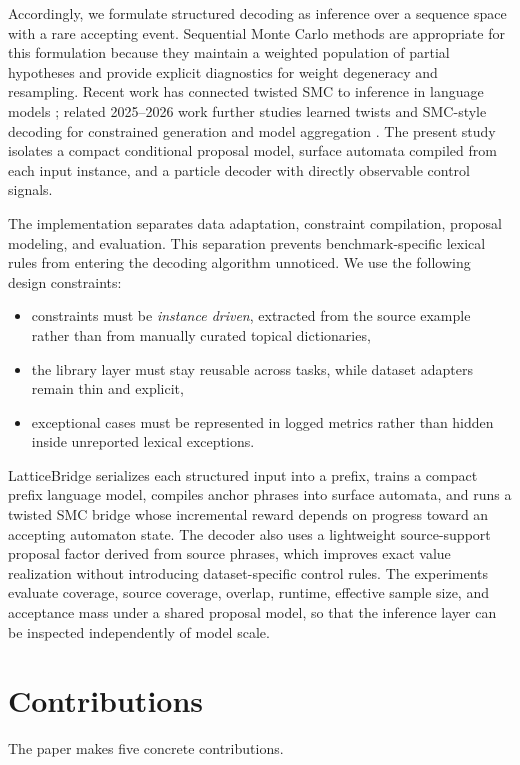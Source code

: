 \documentclass[11pt]{article}
\begin{document}
Accordingly, we formulate structured decoding as inference over a sequence space with a rare accepting event. Sequential Monte Carlo methods are appropriate for this formulation because they maintain a weighted population of partial hypotheses and provide explicit diagnostics for weight degeneracy and resampling. Recent work has connected twisted SMC to inference in language models \citep{zhao2024probabilistic,wu2024step}; related 2025--2026 work further studies learned twists and SMC-style decoding for constrained generation and model aggregation \citep{selfdistilled2025twisted,chan2026ensembling}. The present study isolates a compact conditional proposal model, surface automata compiled from each input instance, and a particle decoder with directly observable control signals.

The implementation separates data adaptation, constraint compilation, proposal modeling, and evaluation. This separation prevents benchmark-specific lexical rules from entering the decoding algorithm unnoticed. We use the following design constraints:
\begin{itemize}[leftmargin=1.5em]
  \item constraints must be \emph{instance driven}, extracted from the source example rather than from manually curated topical dictionaries,
  \item the library layer must stay reusable across tasks, while dataset adapters remain thin and explicit,
  \item exceptional cases must be represented in logged metrics rather than hidden inside unreported lexical exceptions.
\end{itemize}

LatticeBridge serializes each structured input into a prefix, trains a compact prefix language model, compiles anchor phrases into surface automata, and runs a twisted SMC bridge whose incremental reward depends on progress toward an accepting automaton state. The decoder also uses a lightweight source-support proposal factor derived from source phrases, which improves exact value realization without introducing dataset-specific control rules. The experiments evaluate coverage, source coverage, overlap, runtime, effective sample size, and acceptance mass under a shared proposal model, so that the inference layer can be inspected independently of model scale.

\section{Contributions}
The paper makes five concrete contributions.
\end{document}
